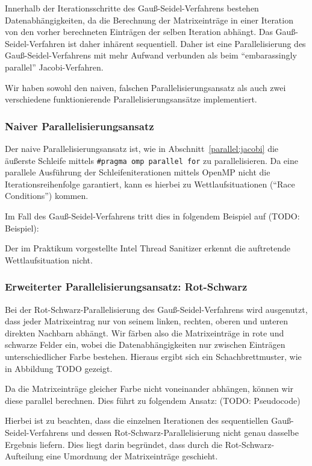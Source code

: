 \documentclass{article}
\begin{document}
Innerhalb der Iterationsschritte des Gauß-Seidel-Verfahrens bestehen Datenabhängigkeiten, da die Berechnung der Matrixeinträge in einer Iteration von den vorher berechneten Einträgen der selben Iteration abhängt. Das Gauß-Seidel-Verfahren ist daher inhärent sequentiell. Daher ist eine Parallelisierung des Gauß-Seidel-Verfahrens mit mehr Aufwand verbunden als beim ``embarassingly parallel'' Jacobi-Verfahren.

Wir haben sowohl den naiven, falschen Parallelisierungsansatz als auch zwei verschiedene funktionierende Parallelisierungsansätze implementiert.

\subsubsection{Naiver Parallelisierungsansatz}\label{gs:naiv}
Der naive Parallelisierungsansatz ist, wie in Abschnitt~\ref{parallel:jacobi} die äußerste Schleife mittels \texttt{\#pragma omp parallel for} zu parallelisieren. Da eine parallele Ausführung der Schleifeniterationen mittels OpenMP nicht die Iterationsreihenfolge garantiert, kann es hierbei zu Wettlaufsituationen (``Race Conditions'') kommen.

Im Fall des Gauß-Seidel-Verfahrens tritt dies in folgendem Beispiel auf (TODO: Beispiel):


Der im Praktikum vorgestellte Intel Thread Sanitizer erkennt die auftretende Wettlaufsituation nicht.

\subsubsection{Erweiterter Parallelisierungsansatz: Rot-Schwarz}

Bei der Rot-Schwarz-Parallelisierung des Gauß-Seidel-Verfahrens wird ausgenutzt, dass jeder Matrixeintrag nur von seinem linken, rechten, oberen und unteren direkten Nachbarn abhängt. Wir färben also die Matrixeinträge in rote und schwarze Felder ein, wobei die Datenabhängigkeiten nur zwischen Einträgen unterschiedlicher Farbe bestehen. Hieraus ergibt sich ein Schachbrettmuster, wie in Abbildung TODO gezeigt.

Da die Matrixeinträge gleicher Farbe nicht voneinander abhängen, können wir diese parallel berechnen. Dies führt zu folgendem Ansatz: (TODO: Pseudocode)

Hierbei ist zu beachten, dass die einzelnen Iterationen des sequentiellen Gauß-Seidel-Verfahrens und dessen Rot-Schwarz-Parallelisierung nicht genau dasselbe Ergebnis liefern. Dies liegt darin begründet, dass durch die Rot-Schwarz-Aufteilung eine Umordnung der Matrixeinträge geschieht.
\end{document}
